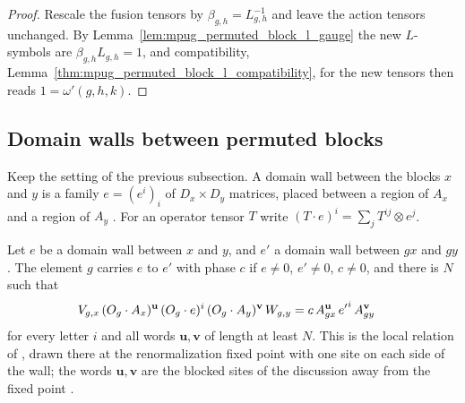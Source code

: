 \begin{proof}\leanok
    Rescale the fusion tensors by $\beta_{g,h}=L_{g,h}^{-1}$ and leave the
    action tensors unchanged. By Lemma~\ref{lem:mpug_permuted_block_l_gauge}
    the new $L$-symbols are $\beta_{g,h}L_{g,h}=1$, and compatibility,
    Lemma~\ref{thm:mpug_permuted_block_l_compatibility}, for the new tensors
    then reads $1=\omega'(g,h,k)$.
\end{proof}

\subsection{Domain walls between permuted blocks}

Keep the setting of the previous subsection. A domain wall between the
blocks $x$ and $y$ is a family $e=(e^i)_{i}$ of $D_x\times D_y$ matrices,
placed between a region of $A_x$ and a region of $A_y$
\cite[Section~III.B]{GarreRubioSchuch2024DomainWall}. For an operator tensor
$T$ write $(T\cdot e)^i=\sum_j T^{ij}\otimes e^j$.

\begin{definition}
    \label{def:mpug_domain_wall_action}
    \leanok
    Let $e$ be a domain wall between $x$ and $y$, and $e'$ a domain wall
    between $gx$ and $gy$. The element $g$ carries $e$ to $e'$ with phase $c$
    if $e\neq0$, $e'\neq0$, $c\neq0$, and there is $N$ such that
    \begin{align}
        V_{g,x}\,(O_g\cdot A_x)^{\mathbf u}\,(O_g\cdot e)^i\,
        (O_g\cdot A_y)^{\mathbf v}\,W_{g,y}
         & =c\,A_{gx}^{\mathbf u}\,{e'}^{i}\,A_{gy}^{\mathbf v}
        \notag
    \end{align}
    for every letter $i$ and all words $\mathbf u,\mathbf v$ of length at
    least $N$. This is the local relation of
    \cite[Section~III.B]{GarreRubioSchuch2024DomainWall}, drawn there at the
    renormalization fixed point with one site on each side of the wall; the
    words $\mathbf u,\mathbf v$ are the blocked sites of the discussion away
    from the fixed point \cite{gap:gs24_domain_wall_nondegenerate}.
\end{definition}

